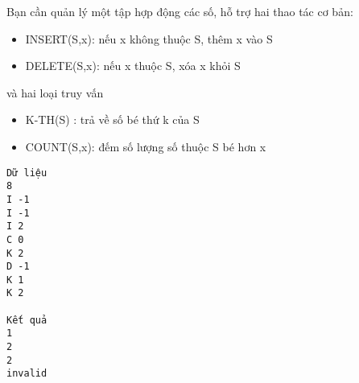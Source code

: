 Bạn cần quản lý một tập hợp động các số, hỗ trợ hai thao tác cơ bản:  
\begin{itemize}
	\item     INSERT(S,x): nếu x không thuộc S, thêm x vào S   
	\item     DELETE(S,x): nếu x thuộc S, xóa x khỏi S   
\end{itemize}

   và hai loại truy vấn  
\begin{itemize}
	\item     K-TH(S) : trả về số bé thứ k của S   
	\item     COUNT(S,x): đếm số lượng số thuộc S bé hơn x   
\end{itemize}
\begin{verbatim}
Dữ liệu
8
I -1
I -1
I 2
C 0
K 2
D -1
K 1
K 2

Kết quả
1
2
2
invalid
\end{verbatim}